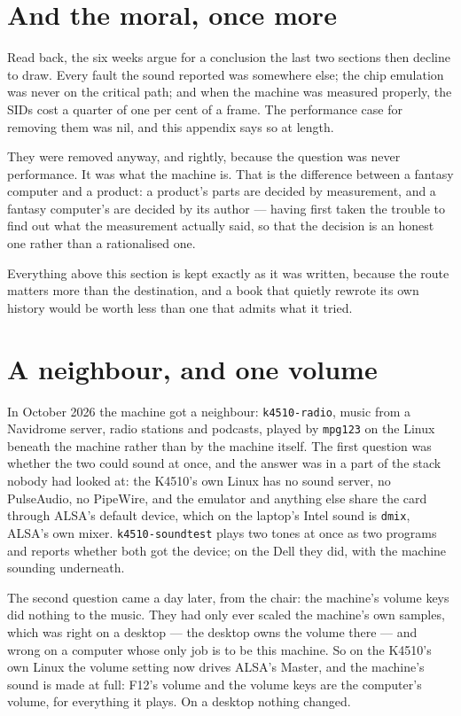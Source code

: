 \section{And the moral, once more}
Read back, the six weeks argue for a conclusion the last two sections
then decline to draw. Every fault the sound reported was somewhere else;
the chip emulation was never on the critical path; and when the machine
was measured properly, the SIDs cost a quarter of one per cent of a
frame. The performance case for removing them was nil, and this appendix
says so at length.

They were removed anyway, and rightly, because the question was never
performance. It was what the machine is. That is the difference between
a fantasy computer and a product: a product's parts are decided by
measurement, and a fantasy computer's are decided by its author ---
having first taken the trouble to find out what the measurement actually
said, so that the decision is an honest one rather than a rationalised
one.

Everything above this section is kept exactly as it was written, because
the route matters more than the destination, and a book that quietly
rewrote its own history would be worth less than one that admits what it
tried.

\section{A neighbour, and one volume}
In October 2026 the machine got a neighbour: \verb|k4510-radio|, music from
a Navidrome server, radio stations and podcasts, played by \verb|mpg123| on
the Linux beneath the machine rather than by the machine itself. The first
question was whether the two could sound at once, and the answer was in a
part of the stack nobody had looked at: the K4510's own Linux has no sound
server, no PulseAudio, no PipeWire, and the emulator and anything else
share the card through ALSA's default device, which on the laptop's Intel
sound is \texttt{dmix}, ALSA's own mixer. \verb|k4510-soundtest| plays two
tones at once as two programs and reports whether both got the device; on
the Dell they did, with the machine sounding underneath.

The second question came a day later, from the chair: the machine's
volume keys did nothing to the music. They had only ever scaled the
machine's own samples, which was right on a desktop --- the desktop owns
the volume there --- and wrong on a computer whose only job is to be this
machine. So on the K4510's own Linux the volume setting now drives ALSA's
Master, and the machine's sound is made at full: F12's volume and the
volume keys are the computer's volume, for everything it plays. On a
desktop nothing changed.

